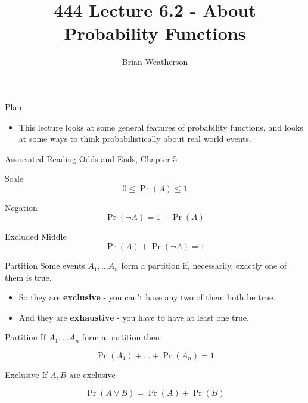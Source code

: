 \documentclass[
  ignorenonframetext,
]{beamer}
\title{444 Lecture 6.2 - About Probability Functions}
\author{Brian Weatherson}
\date{}
\providecommand{\tightlist}{%
  \setlength{\itemsep}{0pt}\setlength{\parskip}{0pt}}
\begin{document}
\frame{\titlepage}

\begin{frame}{Plan}
\protect\hypertarget{plan}{}
\begin{itemize}
\tightlist
\item
  This lecture looks at some general features of probability functions,
  and looks at some ways to think probabilistically about real world
  events.
\end{itemize}
\end{frame}

\begin{frame}{Associated Reading}
\protect\hypertarget{associated-reading}{}
Odds and Ends, Chapter 5
\end{frame}

\begin{frame}{Scale}
\protect\hypertarget{scale}{}
\[
0 \leq \Pr(A) \leq 1
\]
\end{frame}

\begin{frame}{Negation}
\protect\hypertarget{negation}{}
\[
\Pr(\neg A) = 1 - \Pr(A)
\]
\end{frame}

\begin{frame}{Excluded Middle}
\protect\hypertarget{excluded-middle}{}
\[
\Pr(A) + \Pr(\neg A) = 1
\]
\end{frame}

\begin{frame}{Partition}
\protect\hypertarget{partition}{}
Some events \(A_1, \dots A_n\) form a partition if, necessarily, exactly
one of them is true.

\begin{itemize}
\tightlist
\item
  So they are \textbf{exclusive} - you can't have any two of them both
  be true.
\item
  And they are \textbf{exhaustive} - you have to have at least one true.
\end{itemize}
\end{frame}

\begin{frame}{Partition}
\protect\hypertarget{partition-1}{}
If \(A_1, \dots A_n\) form a partition then

\[
\Pr(A_1) + \dots + \Pr(A_n) = 1
\]
\end{frame}

\begin{frame}{Exclusive}
\protect\hypertarget{exclusive}{}
If \(A, B\) are exclusive

\[
\Pr(A \vee B) = \Pr(A) + \Pr(B)
\]
\end{frame}
\end{document}
